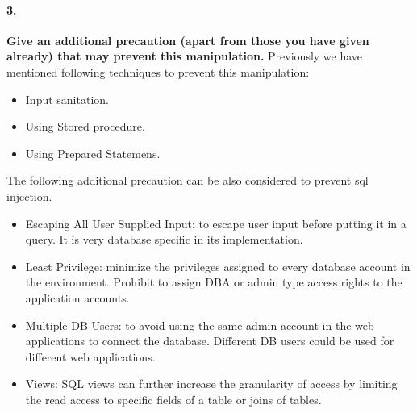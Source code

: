 \documentclass[12pt]{report}
\begin{document}
	\paragraph*{3.} {\bf Give an additional precaution (apart from those you have given already) that may prevent this manipulation.}
	Previously we have mentioned following techniques to prevent this manipulation:
	\begin{itemize}
		\item Input sanitation.
		\item Using Stored procedure.
		\item Using Prepared Statemens.
		
	\end{itemize}
	The following additional precaution can be also considered to prevent sql injection.
	\begin{itemize}
		\item Escaping All User Supplied Input: to escape user input before putting it in a query. It is very database specific in its implementation.
		\item Least Privilege: minimize the privileges assigned to every database account in the environment. Prohibit to assign DBA or admin type access rights to the application accounts.
		\item Multiple DB Users: to avoid using the same admin account in the web applications to connect the database. Different DB users could be used for different web applications.
		\item Views: SQL views can further increase the granularity of access by limiting the read access to specific fields of a table or joins of tables.
	\end{itemize}
	


	
	
\end{document}
